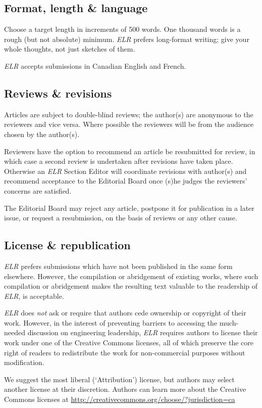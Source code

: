 \subsection{Format, length \& language}
Choose a target length in increments of 500 words.
One thousand words is a rough (but not absolute) minimum.
\emph{ELR} prefers long-format writing; give your whole thoughts, not just sketches of them.

\emph{ELR} accepts submissions in Canadian English and French.

\subsection{Reviews \& revisions}
Articles are subject to double-blind reviews; the author(s) are anonymous to the reviewers and vice versa.
Where possible the reviewers will be from the audience chosen by the author(s).

Reviewers have the option to recommend an article be resubmitted for review, in which case a second review is undertaken after revisions have taken place.
Otherwise an \emph{ELR} Section Editor will coordinate revisions with author(s) and recommend acceptance to the Editorial Board once (s)he judges the reviewers' concerns are satisfied.

The Editorial Board may reject any article, postpone it for publication in a later issue, or request a resubmission, on the basis of reviews or any other cause.

\subsection{License \& republication}
\emph{ELR} prefers submissions which have not been published in the same form elsewhere.
However, the compilation or abridgement of existing works, where such compilation or abridgement makes the resulting text valuable to the readership of \emph{ELR}, is acceptable.

\emph{ELR} does \emph{not} ask or require that authors cede ownership or copyright of their work.
However, in the interest of preventing barriers to accessing the much-needed discussion on engineering leadership, \emph{ELR} requires authors to license their work under one of the Creative Commons licenses, all of which preserve the core right of readers to redistribute the work for non-commercial purposes without modification.

We suggest the most liberal (`Attribution') license, but authors may select another license at their discretion. Authors can learn more about the Creative Commons licenses at \url{http://creativecommons.org/choose/?jurisdiction=ca}

